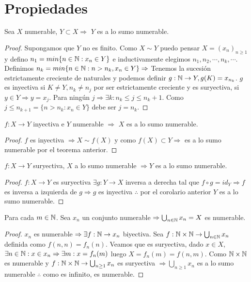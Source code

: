 \section{Propiedades}

\begin{theorem}
    Sea $X$ numerable, $Y \subset X \Rightarrow$ $Y$ es a lo sumo numerable.
    \begin{proof}
        Supongamos que $Y$ no es finito. Como $X \sim Y$ puedo pensar $X = (x_n)_{n\geq1}$ y defino $n_1=min\{ n \in \mathbb{N}: x_n \in Y \}$ e inductivamente elegimos $n_1, n_2, \cdots , n_k, \cdots$. Definimos $n_k = min\{ n \in \mathbb{N} : n > n_k, x_n \in Y \} \Rightarrow$ Tenemos la sucesión estrictamente creciente de naturales y podemos definir $g: \mathbb{N} \to Y, g(K) = x_{n_k}$. $g$ es inyectiva si $K\neq Y, n_k \neq n_j$ por ser estrictamente creciente y es suryectiva, si $y \in Y \Rightarrow y = x_j$. Para ningún $j \Rightarrow \exists k :n_k\leq j \leq n_k+1$. Como $j \leq n_{k+1}=\{ n>n_k:x_n \in Y \}$ debe ser $j = n_k$.
    \end{proof}
\end{theorem}

\begin{corollary}
    $f: X \to Y$ inyectiva e $Y$ numerable $\Rightarrow$ $X$ es a lo sumo numerable.
    \begin{proof}
        $f$ es inyectiva $\Rightarrow X \sim f(X)$ y como $f(X) \subset Y \Rightarrow$ es a lo sumo numerable por el teorema anterior.
    \end{proof}
\end{corollary}

\begin{theorem}
    $f: X \to Y$ suryectiva, $X$ a lo sumo numerable $\Rightarrow Y$ es a lo sumo numerable.
    \begin{proof}
        $f: X \to Y$ es suryectiva $\exists g: Y \to X$ inversa a derecha tal que $f \circ g = id_Y \Rightarrow f$ es inversa a izquierda de $g \Rightarrow g$ es inyectiva $\therefore$ por el corolario anterior $Y$ es a lo sumo numerable.
    \end{proof}
\end{theorem}

\begin{theorem}
    Para cada $m \in \mathbb{N}$. Sea $x_n$ un conjunto numerable $\Rightarrow \bigcup_{n \in \mathbb{N}}x_n = X$ es numerable.
    \begin{proof}
        $x_n$ es numerable $\Rightarrow \exists f:\mathbb{N} \to x_n$ biyectiva. Sea $f:\mathbb{N} \times \mathbb{N} \to \bigcup_{n \in \mathbb{N}} x_n $ definida como $f(n, n) = f_n(n)$. Veamos que es suryectiva, dado $x \in X$, $\exists n \in \mathbb{N}:x \in x_n \Rightarrow \exists m:x=f_n(m)$ luego $X=f_n(m) = f(n, m)$. Como $\mathbb{N} \times \mathbb{N}$ es numerable y $f: \mathbb{N} \times \mathbb{N} \to \bigcup_{n \geq 1}{x_n}$ es suryectiva $\Rightarrow \bigcup_{n \geq 1}x_n$ es a lo sumo numerable $\therefore$ como es infinito, es numerable.
    \end{proof}
\end{theorem}

